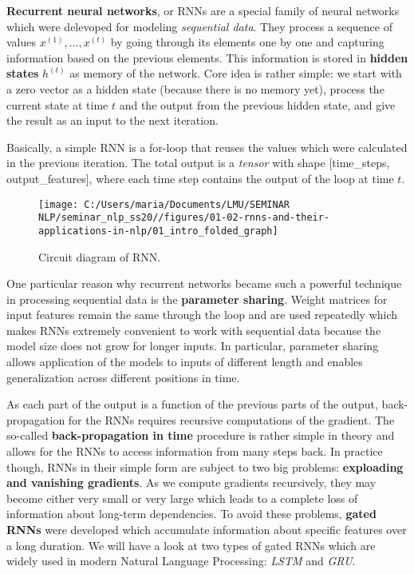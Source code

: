 \documentclass[
]{article}
\author{}
\date{\vspace{-2.5em}}
\begin{document}
\textbf{Recurrent neural networks}, or RNNs are a special family of
neural networks which were delevoped for modeling \emph{sequential
data}. They process a sequence of values \(x^{(1)}, ..., x^{(t)}\) by
going through its elements one by one and capturing information based on
the previous elements. This information is stored in \textbf{hidden
states} \(h^{(t)}\) as memory of the network. Core idea is rather
simple: we start with a zero vector as a hidden state (because there is
no memory yet), process the current state at time \(t\) and the output
from the previous hidden state, and give the result as an input to the
next iteration.

Basically, a simple RNN is a for-loop that reuses the values which were
calculated in the previous iteration. The total output is a
\emph{tensor} with shape {[}time\_steps, output\_features{]}, where each
time step contains the output of the loop at time \(t\).

\begin{figure}

{\centering \texttt{[image: C:/Users/maria/Documents/LMU/SEMINAR NLP/seminar\_nlp\_ss20//figures/01-02-rnns-and-their-applications-in-nlp/01\_intro\_folded\_graph]} 

}

\caption{Circuit diagram of RNN.}\label{fig:pressure}
\end{figure}

One particular reason why recurrent networks became such a powerful
technique in processing sequential data is the \textbf{parameter
sharing}. Weight matrices for input features remain the same through the
loop and are used repeatedly which makes RNNs extremely convenient to
work with sequential data because the model size does not grow for
longer inputs. In particular, parameter sharing allows application of
the models to inputs of different length and enables generalization
across different positions in time.

As each part of the output is a function of the previous parts of the
output, back-propagation for the RNNs requires recursive computations of
the gradient. The so-called \textbf{back-propagation in time} procedure
is rather simple in theory and allows for the RNNs to access information
from many steps back. In practice though, RNNs in their simple form are
subject to two big problems: \textbf{exploading and vanishing
gradients}. As we compute gradients recursively, they may become either
very small or very large which leads to a complete loss of information
about long-term dependencies. To avoid these problems, \textbf{gated
RNNs} were developed which accumulate information about specific
features over a long duration. We will have a look at two types of gated
RNNs which are widely used in modern Natural Language Processing:
\emph{LSTM} and \emph{GRU}.
\end{document}
